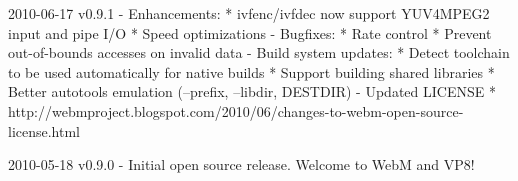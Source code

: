 \begin{DoxyVerbInclude}
2010-06-17 v0.9.1
  - Enhancements:
      * ivfenc/ivfdec now support YUV4MPEG2 input and pipe I/O
      * Speed optimizations
  - Bugfixes:
      * Rate control
      * Prevent out-of-bounds accesses on invalid data
  - Build system updates:
      * Detect toolchain to be used automatically for native builds
      * Support building shared libraries
      * Better autotools emulation (--prefix, --libdir, DESTDIR)
  - Updated LICENSE
      * http://webmproject.blogspot.com/2010/06/changes-to-webm-open-source-license.html


2010-05-18 v0.9.0
  - Initial open source release. Welcome to WebM and VP8!

\end{DoxyVerbInclude}
 